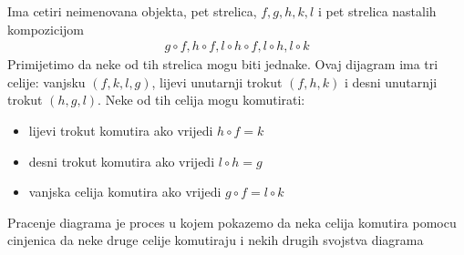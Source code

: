 \documentclass[11pt]{article}
\theoremstyle{definition}
\begin{document}
  \begin{center}
  \end{center}
  Ima cetiri neimenovana objekta, pet strelica, $f, g, h, k, l$ i pet
  strelica nastalih kompozicijom
  \begin{align*}
    g \circ f, h \circ f, l \circ h \circ f, l \circ h, l \circ k
  \end{align*}
  Primijetimo da neke od tih strelica mogu biti jednake.
  Ovaj dijagram ima tri celije: vanjsku $(f, k, l, g)$, lijevi
  unutarnji trokut $(f, h, k)$ i desni unutarnji trokut $(h, g, l)$.
  Neke od tih celija mogu komutirati:
  \begin{itemize}
      \item lijevi trokut komutira ako vrijedi $h \circ f = k$
      \item desni trokut komutira ako vrijedi $l \circ h = g$
      \item vanjska celija komutira ako vrijedi $g \circ f = l \circ k$
  \end{itemize}
  Pracenje diagrama je proces u kojem pokazemo da neka celija komutira pomocu
  cinjenica da neke druge celije komutiraju i nekih drugih svojstva diagrama
\end{document}
